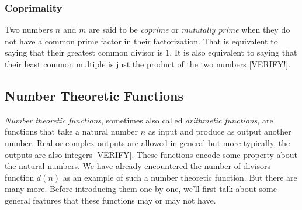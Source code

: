 %
%



\subsubsection{Coprimality}
Two numbers $n$ and $m$ are said to be \emph{coprime} or \emph{mututally prime} when they do not have a common prime factor in their factorization. That is equivalent to saying that their greatest common divisor is $1$. It is also equivalent to saying that their least common multiple is just the product of the two numbers [VERIFY!].


\subsection{Number Theoretic Functions}
\emph{Number theoretic functions}, sometimes also called \emph{arithmetic functions}, are functions that take a natural number $n$ as input and produce as output another number. Real or complex outputs are allowed in general but more typically, the outputs are also integers [VERIFY]. These functions encode some property about the natural numbers. We have already encountered the number of divisors function $d(n)$ as an example of such a number theoretic function. But there are many more. Before introducing them one by one, we'll first talk about some general features that these functions may or may not have.

